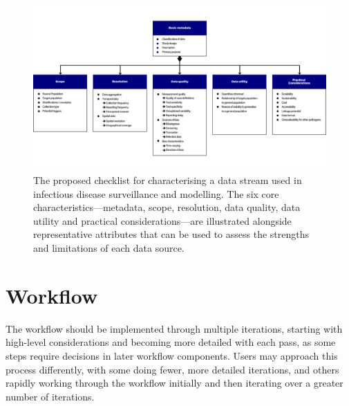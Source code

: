 \documentclass{article}
\begin{document}
\begin{figure}[H] 
\includegraphics[width=1\linewidth]{figures/Abbott et al figure 1.png}
\centering
\caption{The proposed checklist for characterising a data stream used in infectious disease surveillance and modelling. The six core characteristics---metadata, scope, resolution, data quality, data utility and practical considerations---are illustrated alongside representative attributes that can be used to assess the strengths and limitations of each data source. }
\label{data_characteristics}
\end{figure}


\section{Workflow}
\label{sec:workflow}

The workflow should be implemented through multiple iterations, starting with high-level considerations and becoming more detailed with each pass, as some steps require decisions in later workflow components. Users may approach this process differently, with some doing fewer, more detailed iterations, and others rapidly working through the workflow initially and then iterating over a greater number of iterations.
\end{document}
